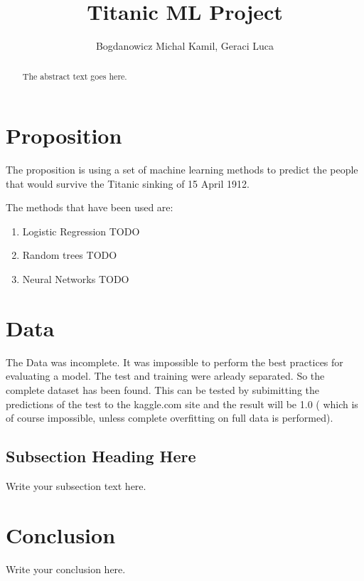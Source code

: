 \documentclass{article}
\begin{document}
\title{Titanic ML Project}
\author{Bogdanowicz Michal Kamil, Geraci Luca}

\maketitle

\begin{abstract}
The abstract text goes here.
\end{abstract}


\section{Proposition}
The proposition is using a set of machine learning methods to predict the people that would survive the Titanic sinking of 15 April 1912.

The methods that have been used are:

\begin{enumerate}  
\item Logistic Regression TODO
\item Random trees TODO
\item Neural Networks TODO
\end{enumerate}

\section{Data}

	
The Data was incomplete. It was impossible to perform the best practices for evaluating a model. The test and training were arleady separated. So the complete dataset has been found. This can be tested by subimitting the predictions of the test to the kaggle.com site and the result will be 1.0 ( which is of course impossible, unless complete overfitting on full data is performed).



\subsection{Subsection Heading Here}
Write your subsection text here.


\section{Conclusion}
Write your conclusion here.
\end{document}
